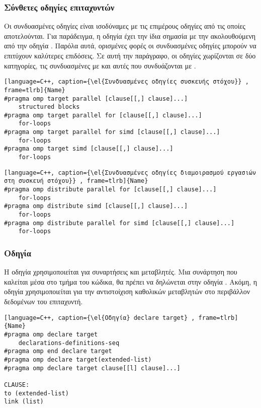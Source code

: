 \subsubsection{Σύνθετες οδηγίες επιταχυντών}
Οι συνδυασμένες οδηγίες είναι ισοδύναμες με τις επιμέρους  οδηγίες από τις οποίες αποτελούνται. Για παράδειγμα, η οδηγία \emph{} έχει την ίδια σημασία με την \emph{} ακολουθούμενη από την οδηγία \emph{}. Παρόλα αυτά, ορισμένες φορές οι συνδυασμένες οδηγίες μπορούν να επιτύχουν καλύτερες επιδόσεις.
Σε αυτή την παράγραφο, οι οδηγίες χωρίζονται σε δύο κατηγορίες, τις συνδυασμένες με \emph{} και αυτές που συνδυάζονται με \emph{}.
\begin{spacing}{1.0}
\begin{lstlisting}[language=C++, caption={\el{Συνδυασμένες οδηγίες συσκευής στόχου}} , frame=tlrb]{Name}
#pragma omp target parallel [clause[[,] clause]...]
	structured blocks
#pragma omp target parallel for [clause[[,] clause]...]
	for-loops	
#pragma omp target parallel for simd [clause[[,] clause]...]
	for-loops
#pragma omp target simd [clause[[,] clause]...]
	for-loops
\end{lstlisting}

\begin{lstlisting}[language=C++, caption={\el{Συνδυασμένες οδηγίες διαμοιρασμού εργασιών στη συσκευή στόχου}} , frame=tlrb]{Name}
#pragma omp distribute parallel for [clause[[,] clause]...]
	for-loops
#pragma omp distribute simd [clause[[,] clause]...]
	for-loops
#pragma omp distribute parallel for simd [clause[[,] clause]...]
	for-loops
\end{lstlisting}
\end{spacing}

\clearpage

\subsubsection{Οδηγία \emph{}}
Η οδηγία \emph{} χρησιμοποιείται για συναρτήσεις και μεταβλητές. Μια συνάρτηση που καλείται μέσα στο τμήμα του \emph{} κώδικα, θα πρέπει να δηλώνεται στην οδηγία \emph{}. Ακόμη, η οδηγία χρησιμοποιείται για την αντιστοίχιση καθολικών μεταβλητών στο περιβάλλον δεδομένων του επιταχυντή.

\begin{spacing}{1.1}
\begin{lstlisting}[language=C++, caption={\el{Οδηγία} declare target} , frame=tlrb]{Name}
#pragma omp declare target
	declarations-definitions-seq
#pragma omp end declare target
#pragma omp declare target(extended-list)
#pragma omp declare target clause[[l] clause]...]

CLAUSE:
to (extended-list)
link (list)
\end{lstlisting}
\end{spacing}
